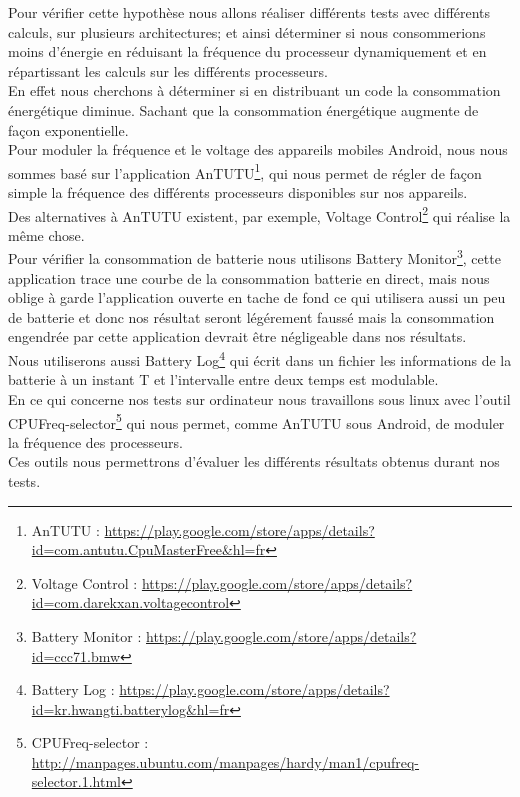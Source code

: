 	Pour vérifier cette hypothèse nous allons réaliser différents tests avec différents calculs, sur plusieurs architectures; et ainsi déterminer si nous consommerions moins d'énergie en réduisant la fréquence du processeur dynamiquement et en répartissant les calculs sur les différents processeurs.\\

	En effet nous cherchons à déterminer si en distribuant un code la consommation énergétique diminue. Sachant que la consommation énergétique augmente de façon exponentielle.\\

	Pour moduler la fréquence et le voltage des appareils mobiles Android, nous nous sommes basé sur l'application AnTUTU\footnote{AnTUTU : \url{https://play.google.com/store/apps/details?id=com.antutu.CpuMasterFree&hl=fr}}, qui nous permet de régler de façon simple la fréquence des différents processeurs disponibles sur nos appareils.\\

	Des alternatives à AnTUTU existent, par exemple, Voltage Control\footnote{Voltage Control : \url{https://play.google.com/store/apps/details?id=com.darekxan.voltagecontrol}} qui réalise la même chose. \\

	Pour vérifier la consommation de batterie nous utilisons Battery Monitor\footnote{Battery Monitor : \url{https://play.google.com/store/apps/details?id=ccc71.bmw}}, cette application trace une courbe de la consommation batterie en direct, mais nous oblige à garde l'application ouverte en tache de fond ce qui utilisera aussi un peu de batterie et donc nos résultat seront légérement faussé mais la consommation engendrée par cette application devrait être négligeable dans nos résultats. \\

	Nous utiliserons aussi Battery Log\footnote{Battery Log : \url{https://play.google.com/store/apps/details?id=kr.hwangti.batterylog&hl=fr}} qui écrit dans un fichier les informations de la batterie à un instant T et l'intervalle entre deux temps est modulable.\\

	En ce qui concerne nos tests sur ordinateur nous travaillons sous linux avec l'outil CPUFreq-selector\footnote{CPUFreq-selector : \url{http://manpages.ubuntu.com/manpages/hardy/man1/cpufreq-selector.1.html}} qui nous permet, comme AnTUTU sous Android, de moduler la fréquence des processeurs.\\

	Ces outils nous permettrons d'évaluer les différents résultats obtenus durant nos tests.
